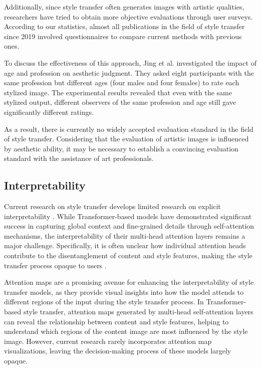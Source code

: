 \documentclass[preprint,12pt]{elsarticle}
\begin{document}
Additionally, since style transfer often generates images with artistic qualities, researchers have tried to obtain more objective evaluations through user surveys. According to our statistics, almost all publications in the field of style transfer since 2019 involved questionnaires to compare current methods with previous ones.

To discuss the effectiveness of this approach, Jing et al.\citep{01jing2019neural} investigated the impact of age and profession on aesthetic judgment. They asked eight participants with the same profession but different ages (four males and four females) to rate each stylized image. The experimental results revealed that even with the same stylized output, different observers of the same profession and age still gave significantly different ratings.

As a result, there is currently no widely accepted evaluation standard in the field of style transfer. Considering that the evaluation of artistic images is influenced by aesthetic ability, it may be necessary to establish a convincing evaluation standard with the assistance of art professionals.

\subsection{Interpretability}

Current research on style transfer develops limited research on explicit interpretability \citep{120wang2022visual, 121angelov2020towards, 122li2018deep, 123qin2023unified}. While Transformer-based models have demonstrated significant success in capturing global context and fine-grained details through self-attention mechanisms, the interpretability of their multi-head attention layers remains a major challenge. Specifically, it is often unclear how individual attention heads contribute to the disentanglement of content and style features, making the style transfer process opaque to users \citep{49deng2022stytr2,50li2023compact,51zhang2024rethink,53zhang2023edge}.

Attention maps are a promising avenue for enhancing the interpretability of style transfer models, as they provide visual insights into how the model attends to different regions of the input during the style transfer process. In Transformer-based style transfer, attention maps generated by multi-head self-attention layers can reveal the relationship between content and style features, helping to understand which regions of the content image are most influenced by the style image. However, current research rarely incorporates attention map visualizations, leaving the decision-making process of these models largely opaque.
\end{document}
